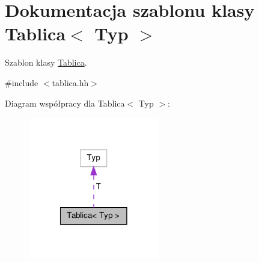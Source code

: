 \hypertarget{class_tablica}{\section{Dokumentacja szablonu klasy Tablica$<$ Typ $>$}
\label{class_tablica}
}


Szablon klasy \hyperlink{class_tablica}{Tablica}.  




{\ttfamily \#include $<$tablica.\-hh$>$}



Diagram współpracy dla Tablica$<$ Typ $>$\-:\nopagebreak
\begin{figure}[H]
\begin{center}
\leavevmode
\includegraphics[width=162pt]{class_tablica__coll__graph}
\end{center}
\end{figure}
